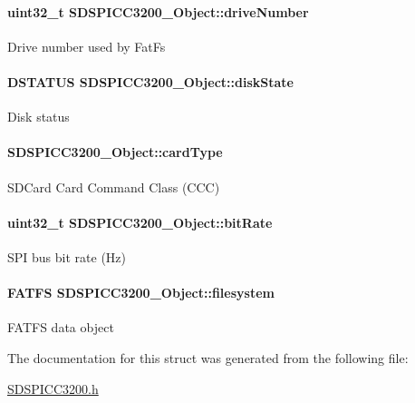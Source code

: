 \paragraph[{drive\+Number}]{\setlength{\rightskip}{0pt plus 5cm}uint32\+\_\+t S\+D\+S\+P\+I\+C\+C3200\+\_\+\+Object\+::drive\+Number}\label{struct_s_d_s_p_i_c_c3200___object_a79ac1ce3451b5ef57859a289ae9fec22}
Drive number used by Fat\+Fs 
\paragraph[{disk\+State}]{\setlength{\rightskip}{0pt plus 5cm}D\+S\+T\+A\+T\+U\+S S\+D\+S\+P\+I\+C\+C3200\+\_\+\+Object\+::disk\+State}\label{struct_s_d_s_p_i_c_c3200___object_ab2616f0419bf15e11e2e066d2af1de49}
Disk status 
\paragraph[{card\+Type}]{ S\+D\+S\+P\+I\+C\+C3200\+\_\+\+Object\+::card\+Type}\label{struct_s_d_s_p_i_c_c3200___object_a4b78b0482f55e904320e627d88979261}
S\+D\+Card Card Command Class (C\+C\+C) 
\paragraph[{bit\+Rate}]{\setlength{\rightskip}{0pt plus 5cm}uint32\+\_\+t S\+D\+S\+P\+I\+C\+C3200\+\_\+\+Object\+::bit\+Rate}\label{struct_s_d_s_p_i_c_c3200___object_a835314275c71a9e04b55e79c01963603}
S\+P\+I bus bit rate (Hz) 
\paragraph[{filesystem}]{\setlength{\rightskip}{0pt plus 5cm}F\+A\+T\+F\+S S\+D\+S\+P\+I\+C\+C3200\+\_\+\+Object\+::filesystem}\label{struct_s_d_s_p_i_c_c3200___object_abe597d34136c1852c3c39971255b2204}
F\+A\+T\+F\+S data object 

The documentation for this struct was generated from the following file\+:\begin{DoxyCompactItemize}
\item 
\hyperlink{_s_d_s_p_i_c_c3200_8h}{S\+D\+S\+P\+I\+C\+C3200.\+h}\end{DoxyCompactItemize}
